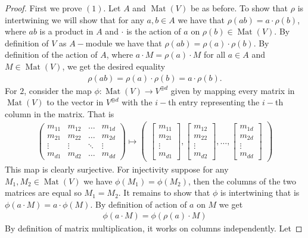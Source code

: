\begin{proof}
    First we prove $(1)$. Let $A$ and $\operatorname{Mat}(V)$ be as before. To show that $\rho$ is intertwining we will show that for any $a,b \in A$ we have that $\rho(a b) = a  \cdot \rho(b)$, where $ab$ is a product in $A$ and $\cdot $ is the action of $a$ on $\rho(b) \in \operatorname{Mat}(V)$. By definition of $V$ as $A-$module we have that $\rho(ab) = \rho(a) \cdot \rho(b)$. By definition of the action of $A$, where $a \cdot M = \rho(a) \cdot M$ for all $a \in A$ and $M \in \operatorname{Mat}(V)$, we get the desired equality 
    \begin{align*}
        \rho(ab) = \rho(a) \cdot \rho(b) = a \cdot \rho(b).
    \end{align*}
For $2$, consider the map $\phi: \operatorname{Mat}(V) \to V^{\oplus d}$ given by mapping every matrix in $\operatorname{Mat}(V)$ to the vector in $V^{\oplus d}$ with the $i-$th entry representing the $i-$th column in the matrix. 
That is 
\begin{align*}
   \begin{pmatrix}
     m_{11} & m_{12} & \dots & m_{1d} \\
    m_{21} & m_{22} & \dots & m_{2d}\\
    \vdots  & \vdots & \ddots & \vdots \\
    m_{d1} & m_{d2} & \dots & m_{dd}
\end{pmatrix} \mapsto \begin{pmatrix}
    \begin{bmatrix} 
         m_{11} \\
         m_{21} \\
         \vdots \\
         m_{d1} 
    \end{bmatrix}, \begin{bmatrix} m_{12} \\ m_{22} \\ \vdots \\ m_{d2}\end{bmatrix}, \dots , \begin{bmatrix}
        m_{1d} \\ m_{2d} \\ \vdots \\ m_{dd} 
    \end{bmatrix}
\end{pmatrix}
\end{align*}
This map is clearly surjective. For injectivity suppose for any $M_1, M_2 \in \operatorname{Mat}(V)$ we have $\phi(M_1) = \phi(M_2)$, then the columns of the two matrices are equal so $M_1 = M_2$. It remains to show that $\phi$ is intertwining that is $\phi(a \cdot M) = a \cdot \phi(M)$. By definition of action of $a$ on $M$ we get 
\begin{align*}
    \phi(a \cdot M) = \phi(\rho(a) \cdot M)
\end{align*}
By definition of matrix multiplication, it works on columns independently. Let 


\end{proof}
